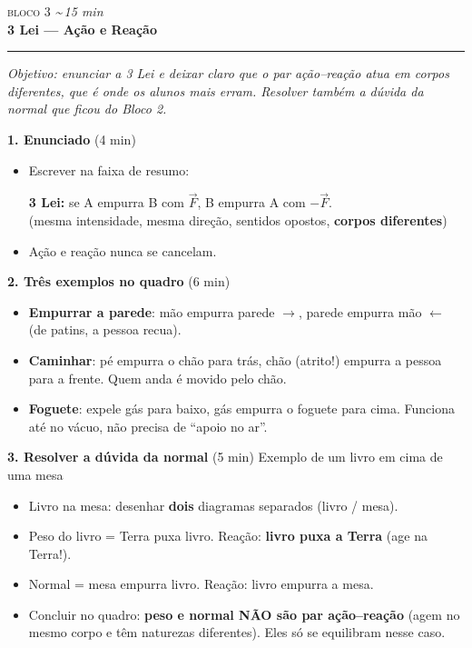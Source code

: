 \documentclass[11pt,a4paper]{article}
\newcommand{\bloco}[3]{%
  \needspace{7\baselineskip}
  \vspace{1.8em}
  {\scshape\color{vinho}bloco #1}\hfill
    {\small\itshape\color{grafite}\textasciitilde\,#3 min}\\[0.1em]
  {\Large\bfseries #2}\\[-0.55em]
  {\color{black!30}\rule{\linewidth}{0.5pt}}
  \par\nobreak\smallskip
}
\newcommand{\objetivo}[1]{{\itshape\color{grafite}Objetivo: #1}\par\smallskip}
\begin{document}
\bloco{3}{3\textordfeminine{} Lei --- A\c{c}\~ao e Rea\c{c}\~ao}{15}

\objetivo{enunciar a 3\textordfeminine{} Lei e deixar claro que o par
a\c{c}\~ao--rea\c{c}\~ao atua em corpos diferentes, que \'e onde os
alunos mais erram. Resolver tamb\'em a d\'uvida da normal que ficou do
Bloco 2.}

\begin{quadro}
\textbf{1. Enunciado} (4 min)
\begin{itemize}[nosep]
  \item Escrever na faixa de resumo:
  \begin{center}
    \textbf{3\textordfeminine{} Lei:} se A empurra B com $\vec{F}$,
    B empurra A com $-\vec{F}$.\\
    \small (mesma intensidade, mesma dire\c{c}\~ao, sentidos opostos,
    \textbf{corpos diferentes})
  \end{center}
  \item Ação e reação nunca se cancelam.
\end{itemize}

\medskip
\textbf{2. Tr\^es exemplos no quadro} (6 min)
\begin{itemize}[nosep]
  \item \textbf{Empurrar a parede}:
        m\~ao empurra parede $\rightarrow$, parede empurra m\~ao
        $\leftarrow$ (de patins, a pessoa recua).
  \item \textbf{Caminhar}: p\'e empurra o ch\~ao para tr\'as, ch\~ao
        (atrito!) empurra a pessoa para a frente. Quem anda \'e movido
        pelo ch\~ao.
  \item \textbf{Foguete}: expele g\'as para baixo, g\'as empurra o
        foguete para cima. Funciona at\'e no v\'acuo, n\~ao precisa de
        ``apoio no ar''.
\end{itemize}

\medskip
\textbf{3. Resolver a d\'uvida da normal} (5 min)
Exemplo de um livro em cima de uma mesa
\begin{itemize}[nosep]
  \item Livro na mesa: desenhar \textbf{dois} diagramas separados
        (livro / mesa).
  \item Peso do livro = Terra puxa livro. Rea\c{c}\~ao: \textbf{livro
        puxa a Terra} (age na Terra!).
  \item Normal = mesa empurra livro. Rea\c{c}\~ao: livro empurra a
        mesa.
  \item Concluir no quadro: \textbf{peso e normal N\~AO s\~ao par
        a\c{c}\~ao--rea\c{c}\~ao} (agem no mesmo corpo e t\^em
        naturezas diferentes). Eles s\'o se equilibram nesse caso.
\end{itemize}
\end{quadro}
\end{document}
